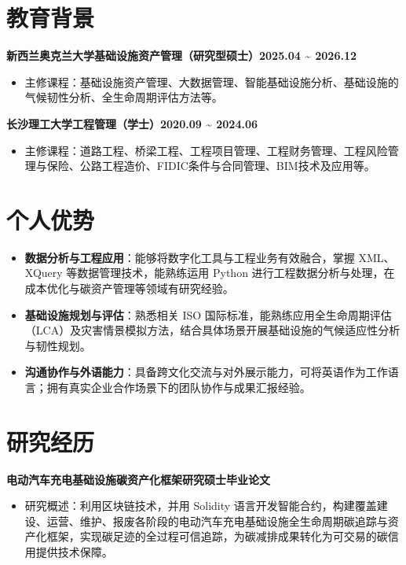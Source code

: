 \documentclass[11pt,a4paper,fontset=none]{ctexart}
\newcommand{\rinfo}[1]{\begin{itemize}[leftmargin=1.2em, labelindent=0pt, labelwidth=0.7em, labelsep=0.5em, itemindent=0pt, label=$\circ$, nosep, topsep=0.15em, itemsep=0em, parsep=0em, partopsep=0em]\item #1\end{itemize}}
\begin{document}
\vspace{\dimexpr 0.8em-6pt\relax}

\section*{教育背景}
\vspace{-0.2em}

\noindent
\textbf{新西兰奥克兰大学}\hfill\textbf{基础设施资产管理（研究型硕士）}\hfill\textbf{2025.04 \textasciitilde{} 2026.12}

\rinfo{主修课程：基础设施资产管理、大数据管理、智能基础设施分析、基础设施的气候韧性分析、全生命周期评估方法等。}

\vspace{0.05em}

\noindent
\textbf{长沙理工大学}\hfill\textbf{工程管理（学士）}\hfill\textbf{2020.09 \textasciitilde{} 2024.06}

\rinfo{主修课程：道路工程、桥梁工程、工程项目管理、工程财务管理、工程风险管理与保险、公路工程造价、FIDIC条件与合同管理、BIM技术及应用等。}

\section*{个人优势}
\vspace{-0.1em}

\rinfo{\textbf{数据分析与工程应用}：能够将数字化工具与工程业务有效融合，掌握 XML、XQuery 等数据管理技术，能熟练运用 Python 进行工程数据分析与处理，在成本优化与碳资产管理等领域有研究经验。}

\rinfo{\textbf{基础设施规划与评估}：熟悉相关 ISO 国际标准，能熟练应用全生命周期评估（LCA）及灾害情景模拟方法，结合具体场景开展基础设施的气候适应性分析与韧性规划。}

\rinfo{\textbf{沟通协作与外语能力}：具备跨文化交流与对外展示能力，可将英语作为工作语言；拥有真实企业合作场景下的团队协作与成果汇报经验。}

\section*{研究经历}
\vspace{-0.1em}

\noindent
\textbf{电动汽车充电基础设施碳资产化框架研究}\hfill{}\textbf{硕士毕业论文}

\rinfo{研究概述：利用区块链技术，并用 Solidity 语言开发智能合约，构建覆盖建设、运营、维护、报废各阶段的电动汽车充电基础设施全生命周期碳追踪与资产化框架，实现碳足迹的全过程可信追踪，为碳减排成果转化为可交易的碳信用提供技术保障。}
\end{document}
